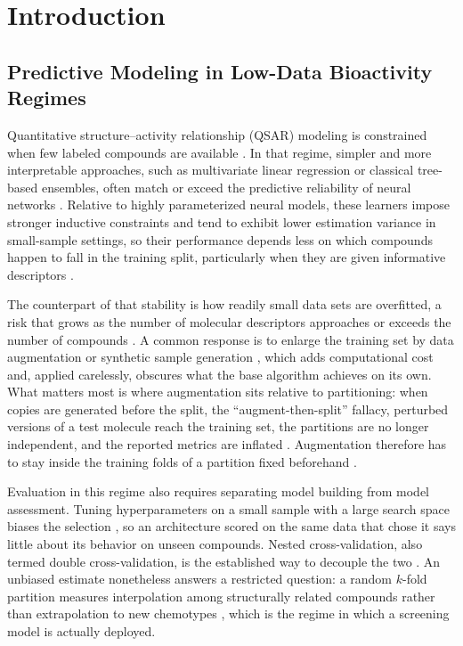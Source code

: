 \section{Introduction}


\subsection{Predictive Modeling in Low-Data Bioactivity Regimes}

Quantitative structure--activity relationship (QSAR) modeling is constrained when few labeled compounds are available
\citep{winkler2026}. In that regime, simpler and more interpretable approaches, such as multivariate linear regression
or classical tree-based ensembles, often match or exceed the predictive reliability of neural networks
\citep{hadas2023, xiewt2023}. Relative to highly parameterized neural models, these learners impose stronger inductive
constraints and tend to exhibit lower estimation variance in small-sample settings, so their performance depends less
on which compounds happen to fall in the training split, particularly when they are given informative descriptors
\citep{xiewt2023}.

The counterpart of that stability is how readily small data sets are overfitted, a risk that grows as the number of
molecular descriptors approaches or exceeds the number of compounds \citep{hawkins2004, godarzi2013}. A common
response is to enlarge the training set by data augmentation or synthetic sample generation \citep{gerz2026,
tyler2025}, which adds computational cost \citep{calle2025} and, applied carelessly, obscures what the base algorithm
achieves on its own. What matters most is where augmentation sits relative to partitioning: when copies are generated
before the split, the ``augment-then-split'' fallacy, perturbed versions of a test molecule reach the training set,
the partitions are no longer independent, and the reported metrics are inflated \citep{gerz2026, john2025,
kannoth2024}. Augmentation therefore has to stay inside the training folds of a partition fixed beforehand
\citep{gerz2026, john2025}.

Evaluation in this regime also requires separating model building from model assessment. Tuning hyperparameters on a
small sample with a large search space biases the selection \citep{cawley2010}, so an architecture scored on the same
data that chose it says little about its behavior on unseen compounds. Nested cross-validation, also termed double
cross-validation, is the established way to decouple the two \citep{bauman2014, cawley2010}. An unbiased estimate
nonetheless answers a restricted question: a random $k$-fold partition measures interpolation among structurally
related compounds rather than extrapolation to new chemotypes \citep{kyrali2022, xiong2020}, which is the regime in
which a screening model is actually deployed.

